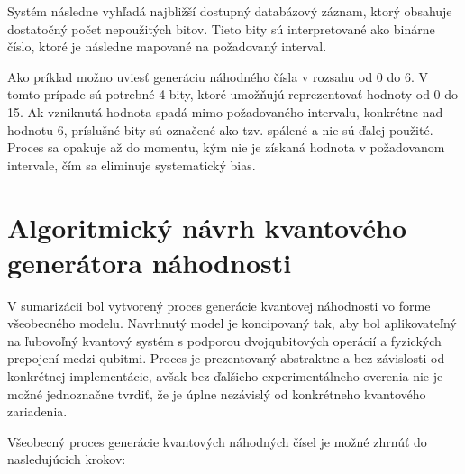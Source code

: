 Systém následne vyhľadá najbližší dostupný databázový záznam, ktorý obsahuje dostatočný počet nepoužitých bitov.
Tieto bity sú interpretované ako binárne číslo, ktoré je následne mapované na požadovaný interval.

Ako príklad možno uviesť generáciu náhodného čísla v rozsahu od 0 do 6.
V tomto prípade sú potrebné 4 bity, ktoré umožňujú reprezentovať hodnoty od 0 do 15.
Ak vzniknutá hodnota spadá mimo požadovaného intervalu, konkrétne nad hodnotu 6, príslušné bity sú označené ako tzv. spálené a nie sú ďalej použité.
Proces sa opakuje až do momentu, kým nie je získaná hodnota v požadovanom intervale, čím sa eliminuje systematický bias.

\section{Algoritmický návrh kvantového generátora náhodnosti}

V sumarizácii bol vytvorený proces generácie kvantovej náhodnosti vo forme všeobecného modelu.
Navrhnutý model je koncipovaný tak, aby bol aplikovateľný na ľubovoľný kvantový systém s podporou dvojqubitových operácií a fyzických prepojení medzi qubitmi.
Proces je prezentovaný abstraktne a bez závislosti od konkrétnej implementácie, avšak bez ďalšieho experimentálneho overenia nie je možné jednoznačne tvrdiť, že je úplne nezávislý od konkrétneho kvantového zariadenia.

Všeobecný proces generácie kvantových náhodných čísel je možné zhrnúť do nasledujúcich krokov:

